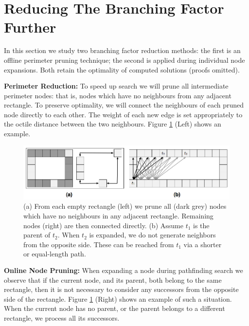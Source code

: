 \section{Reducing The Branching Factor Further}
In this section we study two branching factor reduction methods: the first
is an offline perimeter pruning technique; the second is 
applied during individual node expansions.
Both retain the optimality of computed solutions (proofs omitted).

\noindent
\textbf{Perimeter Reduction:}
To speed up search we will prune all intermediate perimeter nodes: that is, nodes
which have no neighbours from any adjacent rectangle.
To preserve optimality, we will
connect the neighbours of each pruned node directly to each other.  The weight
of each new edge is set appropriately to the octile distance between the two
neighbours.  Figure \ref{fig-branching} (Left) shows an example.  

\begin{figure}[t]
	\begin{center}
	\includegraphics[width=0.97\columnwidth, trim = 10mm 10mm 10mm 0mm]
	{diagrams/branching_wide.png}
	\end{center}
	\vspace{-3pt}
	\caption{(a) From each empty rectangle (left) we prune all (dark grey) nodes which
	have no neighbours in any adjacent rectangle.
	Remaining nodes (right) are then connected directly.
	(b) Assume $t_{1}$ is the parent of $t_2$. When $t_2$
	is expanded, we do not generate neighbors from the opposite side.
	These can be reached from $t_1$ via a shorter or equal-length path.
}
\label{fig-branching}
\end{figure}

\noindent
\textbf{Online Node Pruning:}
When expanding a node during pathfinding search we observe that if the current
node, and its parent, both belong to the same rectangle, then it is not
necessary to consider any successors from the opposite side of the rectangle.
Figure \ref{fig-branching} (Right) shows an example of such a situation. 
When the current node has no parent, or the parent belongs to a different rectangle, 
we process all its successors.
